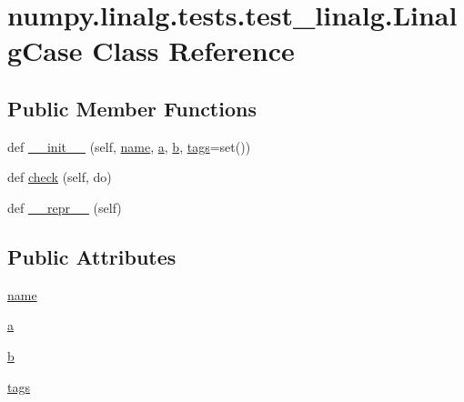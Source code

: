 \hypertarget{classnumpy_1_1linalg_1_1tests_1_1test__linalg_1_1LinalgCase}{}\section{numpy.\+linalg.\+tests.\+test\+\_\+linalg.\+Linalg\+Case Class Reference}
\label{classnumpy_1_1linalg_1_1tests_1_1test__linalg_1_1LinalgCase}
\subsection*{Public Member Functions}
\begin{DoxyCompactItemize}
\item 
def \hyperlink{classnumpy_1_1linalg_1_1tests_1_1test__linalg_1_1LinalgCase_a3ee484cbddbb0602400ed414b61d7b9b}{\+\_\+\+\_\+init\+\_\+\+\_\+} (self, \hyperlink{classnumpy_1_1linalg_1_1tests_1_1test__linalg_1_1LinalgCase_abde1d1ef53aba6c581c3692db30a0a90}{name}, \hyperlink{classnumpy_1_1linalg_1_1tests_1_1test__linalg_1_1LinalgCase_a61a099ac28cabaa9f72323336a58d823}{a}, \hyperlink{classnumpy_1_1linalg_1_1tests_1_1test__linalg_1_1LinalgCase_a5ee0a9b991717fc2ba1d8ce84245e302}{b}, \hyperlink{classnumpy_1_1linalg_1_1tests_1_1test__linalg_1_1LinalgCase_a5edaa46b17430bbbe794c5856d67aaa5}{tags}=set())
\item 
def \hyperlink{classnumpy_1_1linalg_1_1tests_1_1test__linalg_1_1LinalgCase_a736944dd35dcd427b40bfcc408814629}{check} (self, do)
\item 
def \hyperlink{classnumpy_1_1linalg_1_1tests_1_1test__linalg_1_1LinalgCase_a1506f4c65725782a3f622487974538bb}{\+\_\+\+\_\+repr\+\_\+\+\_\+} (self)
\end{DoxyCompactItemize}
\subsection*{Public Attributes}
\begin{DoxyCompactItemize}
\item 
\hyperlink{classnumpy_1_1linalg_1_1tests_1_1test__linalg_1_1LinalgCase_abde1d1ef53aba6c581c3692db30a0a90}{name}
\item 
\hyperlink{classnumpy_1_1linalg_1_1tests_1_1test__linalg_1_1LinalgCase_a61a099ac28cabaa9f72323336a58d823}{a}
\item 
\hyperlink{classnumpy_1_1linalg_1_1tests_1_1test__linalg_1_1LinalgCase_a5ee0a9b991717fc2ba1d8ce84245e302}{b}
\item 
\hyperlink{classnumpy_1_1linalg_1_1tests_1_1test__linalg_1_1LinalgCase_a5edaa46b17430bbbe794c5856d67aaa5}{tags}
\end{DoxyCompactItemize}


